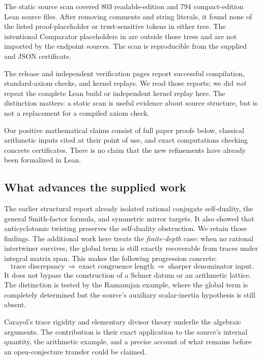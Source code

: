 The static source scan covered 803 readable-edition and 794 compact-edition
Lean source files. After removing comments and string literals, it found
none of the listed proof-placeholder or trust-sensitive tokens in either
 tree. The intentional Comparator placeholders in
 are outside those trees and are not imported by
the endpoint sources. The scan is reproducible from the supplied
 and JSON certificate.

The release and independent verification pages report successful
compilation, standard-axiom checks, and kernel replays. We read those
reports; we did \emph{not} repeat the complete Lean build or independent
kernel replay here.\cite{upstream,sutherland,rubinstein}
The distinction matters: a static scan is useful evidence about source
structure, but is not a replacement for a compiled axiom check.

Our positive mathematical claims consist of full paper proofs below,
classical arithmetic inputs cited at their point of use, and exact
computations checking concrete certificates. There is no claim that the
new refinements have already been formalized in Lean.

\subsection{What advances the supplied work}

The earlier structural report already isolated rational conjugate
self-duality, the general Smith-factor formula, and symmetric mirror
targets. It also showed that anticyclotomic twisting preserves the
self-duality obstruction.\cite{priorstruct}
We retain those findings. The additional work here treats the
\emph{finite-depth} case: when no rational intertwiner survives, the
global term is still exactly recoverable from traces under integral
matrix span. This makes the following progression concrete:
\[
 \text{trace discrepancy}
 \ \Longrightarrow\
 \text{exact congruence length}
 \ \Longrightarrow\
 \text{sharper denominator input}.
\]
It does not bypass the construction of a Selmer datum or an arithmetic
lattice. The distinction is tested by the Ramanujan example, where the
global term is completely determined but the source's auxiliary
scalar-inertia hypothesis is still absent.

Carayol's trace rigidity and elementary divisor theory underlie the
algebraic arguments.\cite{carayol}
The contribution is their exact application to the source's internal
quantity, the arithmetic example, and a precise account of what remains
before an open-conjecture transfer could be claimed.
